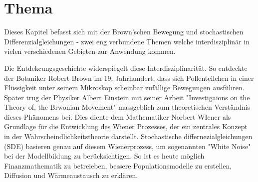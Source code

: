 %
%
%
%
\chapter{Thema\label{chapter:brown}}
\begin{refsection}

Dieses Kapitel befasst sich mit der Brown'schen Bewegung und stochastischen Differenzialgleichungen - zwei eng verbundene Themen welche interdisziplinär in vielen verschiedenen Gebieten zur Anwendung kommen. 

Die Entdekcungsgeschichte widerspiegelt diese Interdisziplinarität. So entdeckte der Botaniker Robert Brown im 19. Jahrhundert, dass sich Pollenteilchen in einer Flüssigkeit unter seinem Mikroskop scheinbar zufällige Bewegungen ausführen. Später trug der Physiker Albert Einstein mit seiner Arbeit "Investigaions on the Theory of, the Brwonian Movement" massgeblich zum theoretischen Verständnis dieses Phänomens bei. Dies diente dem Mathematiker Norbert WIener als Grundlage für die Entwicklung des Wiener Prozesses, der ein zentrales Konzept in der Wahrscheindlichkeitstheorie darstellt. Stochastische differnezialgleichungen (SDE) basieren genau auf diesem Wienerprozess, um sogenannten "White Noise" bei der Modellbildung zu berücksichtigen. So ist es heute möglich Finanzmathematik zu betreieben, bessere Populationsmodelle zu erstellen, Diffusion und Wärmeaustausch zu erklären.








\printbibliography[heading=subbibliography]
\end{refsection}
